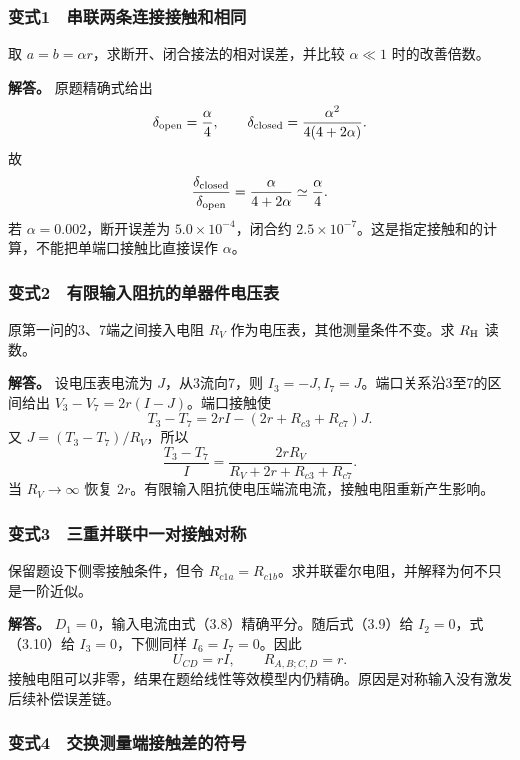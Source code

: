 \documentclass[12pt,a4paper,fontset=fandol]{ctexart}
\begin{document}
\subsubsection{变式1　串联两条连接接触和相同}\label{ux53d8ux5f0f1-ux4e32ux8054ux4e24ux6761ux8fdeux63a5ux63a5ux89e6ux548cux76f8ux540c}

取 \(a=b=\alpha r\)，求断开、闭合接法的相对误差，并比较 \(\alpha\ll1\)
时的改善倍数。

\textbf{解答。} 原题精确式给出 \[
\delta_{\rm open}=\frac\alpha4,\qquad
\delta_{\rm closed}=\frac{\alpha^2}{4(4+2\alpha)}.
\] 故 \[
\frac{\delta_{\rm closed}}{\delta_{\rm open}}
=\frac{\alpha}{4+2\alpha}\simeq\frac\alpha4.
\] 若 \(\alpha=0.002\)，断开误差为 \(5.0\times10^{-4}\)，闭合约
\(2.5\times10^{-7}\)。这是指定接触和的计算，不能把单端口接触比直接误作
\(\alpha\)。

\subsubsection{变式2　有限输入阻抗的单器件电压表}\label{ux53d8ux5f0f2-ux6709ux9650ux8f93ux5165ux963bux6297ux7684ux5355ux5668ux4ef6ux7535ux538bux8868}

原第一问的3、7端之间接入电阻 \(R_V\) 作为电压表，其他测量条件不变。求
\(R_{\rm H}\) 读数。

\textbf{解答。} 设电压表电流为 \(J\)，从3流向7，则
\(I_3=-J,I_7=J\)。端口关系沿3至7的区间给出
\(V_3-V_7=2r(I-J)\)。端口接触使 \[
T_3-T_7=2rI-(2r+R_{c3}+R_{c7})J.
\] 又 \(J=(T_3-T_7)/R_V\)，所以 \[
\boxed{\frac{T_3-T_7}{I}
=\frac{2rR_V}{R_V+2r+R_{c3}+R_{c7}}.}
\] 当 \(R_V\to\infty\) 恢复
\(2r\)。有限输入阻抗使电压端流电流，接触电阻重新产生影响。

\subsubsection{变式3　三重并联中一对接触对称}\label{ux53d8ux5f0f3-ux4e09ux91cdux5e76ux8054ux4e2dux4e00ux5bf9ux63a5ux89e6ux5bf9ux79f0}

保留题设下侧零接触条件，但令
\(R_{c1a}=R_{c1b}\)。求并联霍尔电阻，并解释为何不只是一阶近似。

\textbf{解答。} \(D_1=0\)，输入电流由式（3.8）精确平分。随后式（3.9）给
\(I_2=0\)，式（3.10）给 \(I_3=0\)，下侧同样 \(I_6=I_7=0\)。因此 \[
U_{CD}=rI,\qquad \boxed{R_{A,B;C,D}=r.}
\]
接触电阻可以非零，结果在题给线性等效模型内仍精确。原因是对称输入没有激发后续补偿误差链。

\subsubsection{变式4　交换测量端接触差的符号}\label{ux53d8ux5f0f4-ux4ea4ux6362ux6d4bux91cfux7aefux63a5ux89e6ux5deeux7684ux7b26ux53f7}
\end{document}
